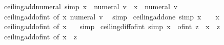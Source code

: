 \begin{isabellebody}
\endisatagproof
{\isafoldproof}%
%
\isadelimproof
\isanewline
%
\endisadelimproof
\isanewline
{}\isamarkupfalse%
\ ceiling{\isacharunderscore}{\kern0pt}add{\isacharunderscore}{\kern0pt}numeral\ {\isacharbrackleft}{\kern0pt}simp{\isacharbrackright}{\kern0pt}{\isacharcolon}{\kern0pt}\ {\isachardoublequoteopen}{\isasymlceil}x\ {\isacharplus}{\kern0pt}\ numeral\ v{\isasymrceil}\ {\isacharequal}{\kern0pt}\ {\isasymlceil}x{\isasymrceil}\ {\isacharplus}{\kern0pt}\ numeral\ v{\isachardoublequoteclose}\isanewline
%
\isadelimproof
\ \ %
\endisadelimproof
%
\isatagproof
{}\isamarkupfalse%
\ ceiling{\isacharunderscore}{\kern0pt}add{\isacharunderscore}{\kern0pt}of{\isacharunderscore}{\kern0pt}int\ {\isacharbrackleft}{\kern0pt}of\ x\ {\isachardoublequoteopen}numeral\ v{\isachardoublequoteclose}{\isacharbrackright}{\kern0pt}\ \isamarkupfalse%
\ simp%
\endisatagproof
{\isafoldproof}%
%
\isadelimproof
\isanewline
%
\endisadelimproof
\isanewline
{}\isamarkupfalse%
\ ceiling{\isacharunderscore}{\kern0pt}add{\isacharunderscore}{\kern0pt}one\ {\isacharbrackleft}{\kern0pt}simp{\isacharbrackright}{\kern0pt}{\isacharcolon}{\kern0pt}\ {\isachardoublequoteopen}{\isasymlceil}x\ {\isacharplus}{\kern0pt}\ {}{\isasymrceil}\ {\isacharequal}{\kern0pt}\ {\isasymlceil}x{\isasymrceil}\ {\isacharplus}{\kern0pt}\ {}{\isachardoublequoteclose}\isanewline
%
\isadelimproof
\ \ %
\endisadelimproof
%
\isatagproof
{}\isamarkupfalse%
\ ceiling{\isacharunderscore}{\kern0pt}add{\isacharunderscore}{\kern0pt}of{\isacharunderscore}{\kern0pt}int\ {\isacharbrackleft}{\kern0pt}of\ x\ {}{\isacharbrackright}{\kern0pt}\ \isamarkupfalse%
\ simp%
\endisatagproof
{\isafoldproof}%
%
\isadelimproof
\isanewline
%
\endisadelimproof
\isanewline
{}\isamarkupfalse%
\ ceiling{\isacharunderscore}{\kern0pt}diff{\isacharunderscore}{\kern0pt}of{\isacharunderscore}{\kern0pt}int\ {\isacharbrackleft}{\kern0pt}simp{\isacharbrackright}{\kern0pt}{\isacharcolon}{\kern0pt}\ {\isachardoublequoteopen}{\isasymlceil}x\ {\isacharminus}{\kern0pt}\ of{\isacharunderscore}{\kern0pt}int\ z{\isasymrceil}\ {\isacharequal}{\kern0pt}\ {\isasymlceil}x{\isasymrceil}\ {\isacharminus}{\kern0pt}\ z{\isachardoublequoteclose}\isanewline
%
\isadelimproof
\ \ %
\endisadelimproof
%
\isatagproof
{}\isamarkupfalse%
\ ceiling{\isacharunderscore}{\kern0pt}add{\isacharunderscore}{\kern0pt}of{\isacharunderscore}{\kern0pt}int\ {\isacharbrackleft}{\kern0pt}of\ x\ {\isachardoublequoteopen}{\isacharminus}{\kern0pt}\ z{\isachardoublequoteclose}{\isacharbrackright}{\kern0pt}\ \isamarkupfalse%

\end{isabellebody}
